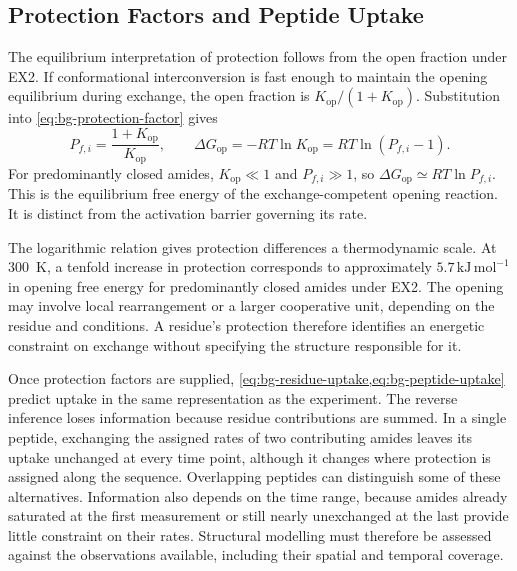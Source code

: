 \subsection{Protection Factors and Peptide Uptake}
\label{sec:bg-protection-uptake}

The equilibrium interpretation of protection follows from the open fraction under EX2. If conformational interconversion is fast enough to maintain the opening equilibrium during exchange, the open fraction is $K_{\text{op}}/(1+K_{\text{op}})$. Substitution into \cref{eq:bg-protection-factor} gives
\begin{equation}
    P_{f,i}=\frac{1+K_{\text{op}}}{K_{\text{op}}},
    \qquad
    \Delta G_{\text{op}}=-RT\ln K_{\text{op}}
    =RT\ln(P_{f,i}-1).
    \label{eq:bg-opening-free-energy}
\end{equation}
For predominantly closed amides, $K_{\text{op}}\ll1$ and $P_{f,i}\gg1$, so $\Delta G_{\text{op}}\simeq RT\ln P_{f,i}$.\supercite{skinnerProteinHydrogenExchange2012,vendruscoloRareFluctuationsNative2003} This is the equilibrium free energy of the exchange-competent opening reaction. It is distinct from the activation barrier governing its rate.

The logarithmic relation gives protection differences a thermodynamic scale. At 300~K, a tenfold increase in protection corresponds to approximately $5.7\,\mathrm{kJ\,mol^{-1}}$ in opening free energy for predominantly closed amides under EX2. The opening may involve local rearrangement or a larger cooperative unit, depending on the residue and conditions.\supercite{englanderHydrogenExchangeModern1997} A residue's protection therefore identifies an energetic constraint on exchange without specifying the structure responsible for it.

Once protection factors are supplied, \cref{eq:bg-residue-uptake,eq:bg-peptide-uptake} predict uptake in the same representation as the experiment. The reverse inference loses information because residue contributions are summed. In a single peptide, exchanging the assigned rates of two contributing amides leaves its uptake unchanged at every time point, although it changes where protection is assigned along the sequence. Overlapping peptides can distinguish some of these alternatives.\supercite{skinnerEstimatingConstraintsProtection2019} Information also depends on the time range, because amides already saturated at the first measurement or still nearly unexchanged at the last provide little constraint on their rates. Structural modelling must therefore be assessed against the observations available, including their spatial and temporal coverage.


